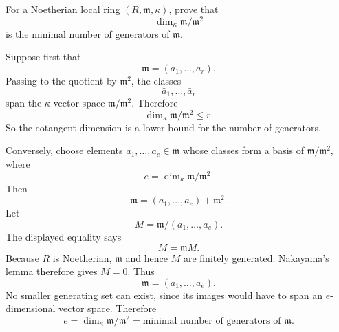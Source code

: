 \begin{problem}\label{prob:vi32-05}
For a Noetherian local ring \((R,\mathfrak m,\kappa)\), prove that
\[
\dim_\kappa\mathfrak m/\mathfrak m^2
\]
is the minimal number of generators of \(\mathfrak m\).

\end{problem}

\ifdefined\FullProblemDossiers
\begin{solution}
Suppose first that
\[
\mathfrak m=(a_1,\ldots,a_r).
\]
Passing to the quotient by \(\mathfrak m^2\), the classes
\[
\bar a_1,\ldots,\bar a_r
\]
span the \(\kappa\)-vector space \(\mathfrak m/\mathfrak m^2\). Therefore
\[
\dim_\kappa\mathfrak m/\mathfrak m^2\le r.
\]
So the cotangent dimension is a lower bound for the number of generators.

Conversely, choose elements \(a_1,\ldots,a_e\in\mathfrak m\) whose classes form a basis of
\(\mathfrak m/\mathfrak m^2\), where
\[
e=\dim_\kappa\mathfrak m/\mathfrak m^2.
\]
Then
\[
\mathfrak m=(a_1,\ldots,a_e)+\mathfrak m^2.
\]
Let
\[
M=\mathfrak m/(a_1,\ldots,a_e).
\]
The displayed equality says
\[
M=\mathfrak mM.
\]
Because \(R\) is Noetherian, \(\mathfrak m\) and hence \(M\) are finitely generated. Nakayama's lemma therefore
gives \(M=0\). Thus
\[
\mathfrak m=(a_1,\ldots,a_e).
\]
No smaller generating set can exist, since its images would have to span an \(e\)-dimensional vector space.
Therefore
\[
\boxed{
e=\dim_\kappa\mathfrak m/\mathfrak m^2
=
\text{minimal number of generators of }\mathfrak m.
}
\]
\end{solution}
\fi
